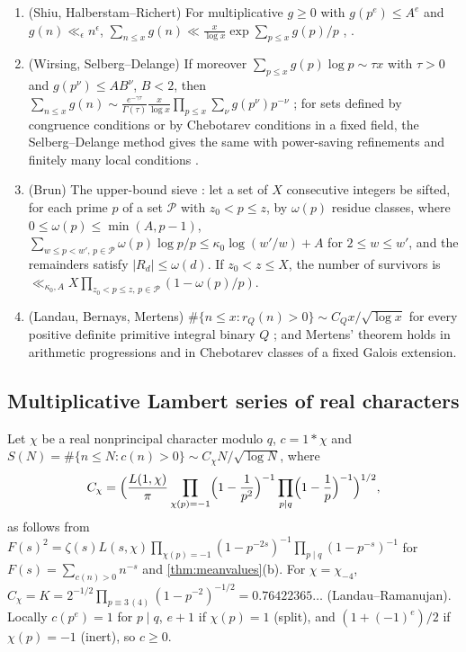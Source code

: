 \documentclass[11pt]{article}
\newcommand{\cnt}{\#}
\begin{document}
\begin{theorem}\label{thm:meanvalues}
\leavevmode
\begin{enumerate}[label=\textup{(\alph*)},nosep]
\item \textup{(Shiu, Halberstam--Richert)} For multiplicative $g\ge0$ with $g(p^e)\le A^e$ and
$g(n)\ll_\epsilon n^\epsilon$, $\sum_{n\le x}g(n)\ll\frac x{\log x}\exp\sum_{p\le x}g(p)/p$
\cite[Thm.~1]{Shiu1980}, \cite{HalberstamRichert}.
\item \textup{(Wirsing, Selberg--Delange)} If moreover $\sum_{p\le x}g(p)\log p\sim\tau x$ with
$\tau>0$ and $g(p^\nu)\le AB^\nu$, $B<2$, then
$\sum_{n\le x}g(n)\sim\frac{e^{-\gamma\tau}}{\Gamma(\tau)}\frac x{\log x}\prod_{p\le x}\sum_\nu g(p^\nu)p^{-\nu}$
\cite{Wirsing1961}; for sets defined by congruence conditions or by Chebotarev conditions in a
fixed field, the Selberg--Delange method gives the same with power-saving refinements and
finitely many local conditions \cite[II.5]{Tenenbaum}.
\item \textup{(Brun)} The upper-bound sieve \cite[Thm.~2.2]{HalberstamRichert}: let a set of
$X$ consecutive integers be sifted, for each prime $p$ of a set $\mathcal P$ with
$z_0<p\le z$, by $\omega(p)$ residue classes, where $0\le\omega(p)\le\min(A,p-1)$,
$\sum_{w\le p<w',\,p\in\mathcal P}\omega(p)\log p/p\le\kappa_0\log(w'/w)+A$ for
$2\le w\le w'$, and the remainders satisfy $|R_d|\le\omega(d)$. If $z_0<z\le X$, the
number of survivors is $\ll_{\kappa_0,A}X\prod_{z_0<p\le z,\,p\in\mathcal P}(1-\omega(p)/p)$.
\item \textup{(Landau, Bernays, Mertens)} $\cnt\{n\le x:r_Q(n)>0\}\sim C_Qx/\sqrt{\log x}$ for
every positive definite primitive integral binary $Q$
\cite{Landau1908,Bernays1912,BMO2011}; and Mertens' theorem holds in arithmetic progressions
and in Chebotarev classes of a fixed Galois extension.
\end{enumerate}
\end{theorem}

\subsection{Multiplicative Lambert series of real characters}\label{subsec:lambertradix}

Let $\chi$ be a real nonprincipal character modulo $q$, $c=1*\chi$ and
$S(N)=\cnt\{n\le N:c(n)>0\}\sim C_\chi N/\sqrt{\log N}$, where
\[
C_\chi=\Bigl(\frac{L(1,\chi)}{\pi}\prod_{\chi(p)=-1}\Bigl(1-\frac1{p^2}\Bigr)^{-1}\prod_{p\mid q}\Bigl(1-\frac1p\Bigr)^{-1}\Bigr)^{1/2},
\]
as follows from $F(s)^2=\zeta(s)L(s,\chi)\prod_{\chi(p)=-1}(1-p^{-2s})^{-1}\prod_{p\mid q}(1-p^{-s})^{-1}$
for $F(s)=\sum_{c(n)>0}n^{-s}$ and \cref{thm:meanvalues}(b). For $\chi=\chi_{-4}$,
$C_\chi=K=2^{-1/2}\prod_{p\equiv3\,(4)}(1-p^{-2})^{-1/2}=0.76422365\ldots$ (Landau--Ramanujan).
Locally $c(p^e)=1$ for $p\mid q$, $e+1$ if $\chi(p)=1$ (split), and $(1+(-1)^e)/2$ if
$\chi(p)=-1$ (inert), so $c\ge0$.
\end{document}
